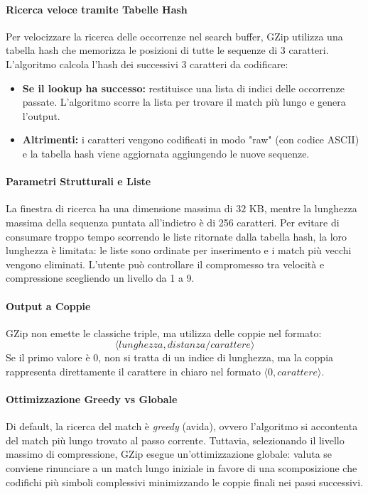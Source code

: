 \paragraph{Ricerca veloce tramite Tabelle Hash}
Per velocizzare la ricerca delle occorrenze nel search buffer, GZip utilizza una tabella hash che memorizza le posizioni di tutte le sequenze di 3 caratteri. L'algoritmo calcola l'hash dei successivi 3 caratteri da codificare:
\begin{itemize}
    \item \textbf{Se il lookup ha successo:} restituisce una lista di indici delle occorrenze passate. L'algoritmo scorre la lista per trovare il match più lungo e genera l'output.
    \item \textbf{Altrimenti:} i caratteri vengono codificati in modo "raw" (con codice ASCII) e la tabella hash viene aggiornata aggiungendo le nuove sequenze.
\end{itemize}

\paragraph{Parametri Strutturali e Liste}
La finestra di ricerca ha una dimensione massima di $32\text{ KB}$, mentre la lunghezza massima della sequenza puntata all'indietro è di 256 caratteri. Per evitare di consumare troppo tempo scorrendo le liste ritornate dalla tabella hash, la loro lunghezza è limitata: le liste sono ordinate per inserimento e i match più vecchi vengono eliminati. L'utente può controllare il compromesso tra velocità e compressione scegliendo un livello da 1 a 9.

\paragraph{Output a Coppie}
GZip non emette le classiche triple, ma utilizza delle coppie nel formato:
\[ \langle \mathit{lunghezza}, \mathit{distanza/carattere} \rangle \]
Se il primo valore è $0$, non si tratta di un indice di lunghezza, ma la coppia rappresenta direttamente il carattere in chiaro nel formato $\langle 0, \mathit{carattere} \rangle$.

\paragraph{Ottimizzazione Greedy vs Globale}
Di default, la ricerca del match è \textit{greedy} (avida), ovvero l'algoritmo si accontenta del match più lungo trovato al passo corrente. Tuttavia, selezionando il livello massimo di compressione, GZip esegue un'ottimizzazione globale: valuta se conviene rinunciare a un match lungo iniziale in favore di una scomposizione che codifichi più simboli complessivi minimizzando le coppie finali nei passi successivi.


